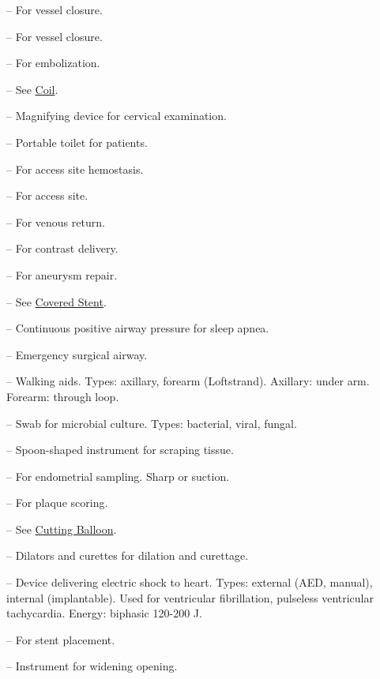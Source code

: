 -- For vessel closure.

-- For vessel closure.

-- For embolization.

-- See \hyperlink{Coil}{Coil}.

-- Magnifying device for cervical examination.

-- Portable toilet for patients.

-- For access site hemostasis.

-- For access site.

-- For venous return.

-- For contrast delivery.

-- For aneurysm repair.

-- See \hyperlink{Covered Stent}{Covered Stent}.

-- Continuous positive airway pressure for sleep apnea.

-- Emergency surgical airway.

-- Walking aids. Types: axillary, forearm (Loftstrand). Axillary: under arm. Forearm: through loop.

-- Swab for microbial culture. Types: bacterial, viral, fungal.

-- Spoon-shaped instrument for scraping tissue.

-- For endometrial sampling. Sharp or suction.

-- For plaque scoring.

-- See \hyperlink{Cutting Balloon}{Cutting Balloon}.

-- Dilators and curettes for dilation and curettage.

-- Device delivering electric shock to heart. Types: external (AED, manual), internal (implantable). Used for ventricular fibrillation, pulseless ventricular tachycardia. Energy: biphasic 120-200 J.

-- For stent placement.

-- Instrument for widening opening.

